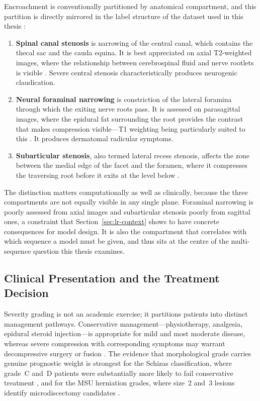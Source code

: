 Encroachment is conventionally partitioned by anatomical compartment, and this
partition is directly mirrored in the label structure of the dataset used in
this thesis \cite{richards2026the}:

\begin{enumerate}
  \item \textbf{Spinal canal stenosis} is narrowing of the central canal, which
  contains the thecal sac and the cauda equina. It is best appreciated on axial
  T2-weighted images, where the relationship between cerebrospinal fluid and
  nerve rootlets is visible \cite{schizas2010qualitative,lee2011a}. Severe
  central stenosis characteristically produces neurogenic claudication.

  \item \textbf{Neural foraminal narrowing} is constriction of the lateral
  foramina through which the exiting nerve roots pass. It is assessed on
  parasagittal images, where the epidural fat surrounding the root provides the
  contrast that makes compression visible---T1 weighting being particularly
  suited to this \cite{lee2010a}. It produces dermatomal radicular symptoms.

  \item \textbf{Subarticular stenosis}, also termed lateral recess stenosis,
  affects the zone between the medial edge of the facet and the foramen, where
  it compresses the traversing root before it exits at the level below
  \cite{lurie2008reliability,andreisek2014consensus}.
\end{enumerate}

The distinction matters computationally as well as clinically, because the three
compartments are not equally visible in any single plane. Foraminal narrowing is
poorly assessed from axial images and subarticular stenosis poorly from
sagittal ones, a constraint that Section~\ref{sec:lr-context} shows to have
concrete consequences for model design. It is also the compartment that
correlates with which sequence a model must be given, and thus sits at the
centre of the multi-sequence question this thesis examines.

\subsection{Clinical Presentation and the Treatment Decision}
\label{sec:lr-treatment}

Severity grading is not an academic exercise; it partitions patients into
distinct management pathways. Conservative management---physiotherapy, analgesia,
epidural steroid injection---is appropriate for mild and most moderate disease,
whereas severe compression with corresponding symptoms may warrant decompressive
surgery or fusion \cite{schizas2010qualitative,mysliwiec2010msu}. The evidence
that morphological grade carries genuine prognostic weight is strongest for the
Schizas classification, where grade~C and~D patients were substantially more
likely to fail conservative treatment \cite{schizas2010qualitative}, and for the
MSU herniation grades, where size~2 and~3 lesions identify microdiscectomy
candidates \cite{mysliwiec2010msu}.

